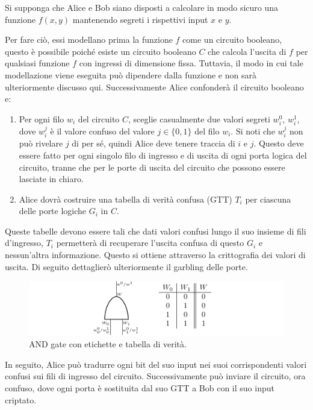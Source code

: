 \documentclass[
  italian,
]{book}
\providecommand{\tightlist}{%
  \setlength{\itemsep}{0pt}\setlength{\parskip}{0pt}}
\begin{document}
Si supponga che Alice e Bob siano disposti a calcolare in modo sicuro una funzione \(f(x, y)\) mantenendo segreti i rispettivi input \(x\) e \(y\).

Per fare ciò, essi modellano prima la funzione \(f\) come un circuito booleano, questo è possibile poiché esiste un circuito booleano \(C\) che calcola l'uscita di \(f\) per qualsiasi funzione \(f\) con ingressi di dimensione fissa. Tuttavia, il modo in cui tale modellazione viene eseguita può dipendere dalla funzione e non sarà ulteriormente discusso qui. Successivamente Alice confonderà il circuito booleano e:

\begin{enumerate}
\def\labelenumi{\arabic{enumi}.}
\tightlist
\item
  Per ogni filo \(w_i\) del circuito \(C\), sceglie casualmente due valori segreti \(w^{0}_{i}\), \(w^{1}_{i}\), dove \(w^{j}_{i}\) è il valore confuso del valore \(j \in \{0,1\}\) del filo \(w_i\). Si noti che \(w^{j}_{i}\) non può rivelare \(j\) di per sé, quindi Alice deve tenere traccia di \(i\) e \(j\). Questo deve essere fatto per ogni singolo filo di ingresso e di uscita di ogni porta logica del circuito, tranne che per le porte di uscita del circuito che possono essere lasciate in chiaro.
\item
  Alice dovrà costruire una tabella di verità confusa (GTT) \(T_i\) per ciascuna delle porte logiche \(G_i\) in \(C\).
\end{enumerate}

\newpage

Queste tabelle devono essere tali che dati valori confusi lungo il suo insieme di fili d'ingresso, \(T_i\) permetterà di recuperare l'uscita confusa di questo \(G_i\) e nessun'altra informazione. Questo si ottiene attraverso la crittografia dei valori di uscita. Di seguito dettaglierò ulteriormente il garbling delle porte.

\begin{figure}
\centering
\includegraphics{./media/01.png}
\caption{\label{fig:chunk-label}AND gate con etichette e tabella di verità.}
\end{figure}

In seguito, Alice può tradurre ogni bit del suo input nei suoi corrispondenti valori confusi sui fili di ingresso del circuito. Successivamente può inviare il circuito, ora confuso, dove ogni porta è sostituita dal suo GTT a Bob con il suo input criptato.
\end{document}
